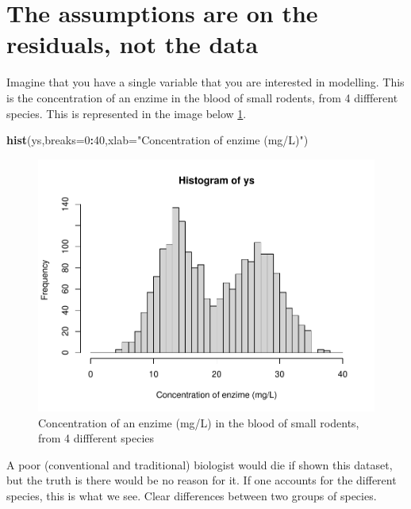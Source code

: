 \documentclass[
]{book}
\newenvironment{Shaded}{\begin{snugshade}}{\end{snugshade}}
\newcommand{\DataTypeTok}[1]{\textcolor[rgb]{0.13,0.29,0.53}{#1}}
\newcommand{\DecValTok}[1]{\textcolor[rgb]{0.00,0.00,0.81}{#1}}
\newcommand{\KeywordTok}[1]{\textcolor[rgb]{0.13,0.29,0.53}{\textbf{#1}}}
\newcommand{\NormalTok}[1]{#1}
\newcommand{\OperatorTok}[1]{\textcolor[rgb]{0.81,0.36,0.00}{\textbf{#1}}}
\newcommand{\StringTok}[1]{\textcolor[rgb]{0.31,0.60,0.02}{#1}}
\begin{document}
\hypertarget{the-assumptions-are-on-the-residuals-not-the-data}{%
\section{The assumptions are on the residuals, not the data}\label{the-assumptions-are-on-the-residuals-not-the-data}}

Imagine that you have a single variable that you are interested in modelling. This is the concentration of an enzime in the blood of small rodents, from 4 diffferent species. This is represented in the image below \ref{fig:figrodents}.

\begin{Shaded}
\begin{Highlighting}[]
\KeywordTok{hist}\NormalTok{(ys,}\DataTypeTok{breaks=}\DecValTok{0}\OperatorTok{:}\DecValTok{40}\NormalTok{,}\DataTypeTok{xlab=}\StringTok{"Concentration of enzime (mg/L)"}\NormalTok{)}
\end{Highlighting}
\end{Shaded}

\begin{figure}

{\centering \includegraphics[width=0.8\linewidth]{ECOMODbook_files/figure-latex/figrodents-1} 

}

\caption{Concentration of an enzime (mg/L) in the blood of small rodents, from 4 diffferent species}\label{fig:figrodents}
\end{figure}

A poor (conventional and traditional) biologist would die if shown this dataset, but the truth is there would be no reason for it. If one accounts for the different species, this is what we see. Clear differences between two groups of species.
\end{document}
